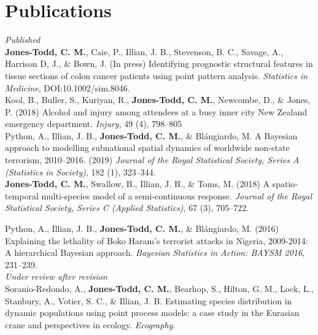 \documentclass[10pt,a4paper]{moderncv}
\begin{document}
  \section{Publications}
  \vspace{5pt}

  \textit{\small{Published}}\\
  
\vspace{-3pt}
\textbf{Jones-Todd, C. M.}, Caie, P., Illian, J. B., Stevenson, B. C., Savage, A., Harrison D, J., \& Bown, J. (In press) Identifying prognostic structural features in tissue sections of colon cancer patients using point pattern analysis. \textit{Statistics in Medicine}, DOI:10.1002/sim.8046.\\


\vspace{-3pt}
Kool, B., Buller, S., Kuriyan, R., \textbf{Jones-Todd, C. M.}, Newcombe, D., \& Jones, P. (2018) Alcohol and injury among attendees at a busy inner city New Zealand emergency department. \textit{Injury}, 49 (4), 798--805\\


\vspace{-3pt}
Python, A.,  Illian, J. B., \textbf{Jones-Todd, C. M.}, \& Bl\'{a}ngiardo, M. A Bayesian approach to modelling subnational spatial dynamics of worldwide non-state terrorism, 2010--2016. (2019) \textit{Journal of the Royal Statistical Society, Series  A (Statistics in Society)}, 182 (1), 323--344.\\

  \textbf{Jones-Todd, C. M.}, Swallow, B., Illian, J. B., \& Toms, M. (2018) A spatio-temporal multi-species model of a semi-continuous response. \textit{Journal of the Royal Statistical Society, Series C (Applied Statistics)}, 67 (3), 705--722.\\
\vspace{5pt}

\vspace{-3pt}
Python, A.,  Illian, J. B., \textbf{Jones-Todd, C. M.}, \& Bl\'{a}ngiardo, M. (2016) Explaining the lethality of Boko Haram’s terrorist attacks in Nigeria, 2009-2014: A hierarchical Bayesian approach. \textit{Bayesian Statistics in Action: BAYSM 2016}, 231--239.\\


\textit{\small{Under review after revision}}\\

\vspace{-3pt}
Soranio-Redondo, A., \textbf{Jones-Todd, C. M.}, Bearhop, S., Hilton, G. M., Lock, L., Stanbury, A., Votier, S. C., \& Illian, J. B. Estimating species distribution in dynamic populations using point process models: a case study in the Eurasian crane and perspectives in ecology. \textit{Ecography}.\\
\end{document}
